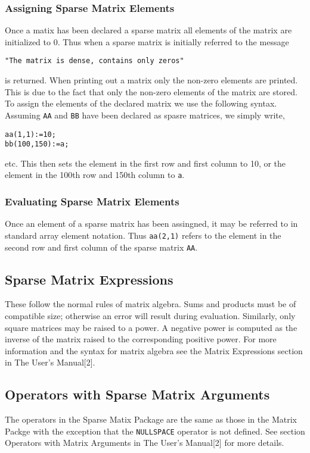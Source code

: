 \subsubsection{Assigning Sparse Matrix Elements}
Once a matix has been declared a sparse matrix all elements of the 
matrix are initialized to 0. Thus when a sparse matrix is initially 
referred to the message
\begin{verbatim}
"The matrix is dense, contains only zeros"
\end{verbatim}
is returned. When printing out a matrix only the non-zero elements are 
printed. This is due to the fact that only the non-zero elements of the 
matrix are stored. 
To assign the elements of the declared matrix we use the following 
syntax. Assuming \texttt{AA} and \texttt{BB} have been declared as spasre 
matrices, we simply write,
\begin{verbatim}
aa(1,1):=10;
bb(100,150):=a;
\end{verbatim}
etc. This then sets the element in the first row and first column to 10,
or the element in the 100th row and 150th column to \texttt{a}.

\subsubsection{Evaluating Sparse Matrix Elements}
Once an element of a sparse matrix has been assingned, it may be referred
to in standard array element notation. Thus \texttt{aa(2,1)} refers to the 
element in the second row and first column of the sparse matrix \texttt{AA}.

\subsection{Sparse Matrix Expressions}
These follow the normal rules of matrix algebra. Sums and products must 
be of compatible size; otherwise an error will result during evaluation.
Similarly, only square matrices may be raised to a power.
A negative power is computed as the inverse of the matrix raised to the
corresponding positive power. For more information and the syntax for 
matrix algebra see the Matrix Expressions section in The \REDUCE{} 
User's Manual[2].

\subsection{Operators with Sparse Matrix Arguments}
The operators in the Sparse Matix Package are the same as those in the
Matrix Packge with the exception that the \texttt{NULLSPACE} operator is 
not defined. See section Operators with Matrix Arguments in The 
\REDUCE{} User's Manual[2] for more details.
